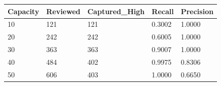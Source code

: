 \begin{tabular}{lllll}
\toprule
Capacity & Reviewed & Captured\_High & Recall & Precision \\
\midrule
10 & 121 & 121 & 0.3002 & 1.0000 \\
20 & 242 & 242 & 0.6005 & 1.0000 \\
30 & 363 & 363 & 0.9007 & 1.0000 \\
40 & 484 & 402 & 0.9975 & 0.8306 \\
50 & 606 & 403 & 1.0000 & 0.6650 \\
\bottomrule
\end{tabular}